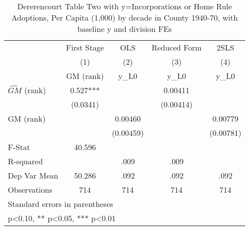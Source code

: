 \begin{table}[htbp]\centering
\def\sym#1{\ifmmode^{#1}\else\(^{#1}\)\fi}
\caption{Dererencourt Table Two with y=Incorporations or Home Rule Adoptions, Per Capita (1,000) by decade in County 1940-70, with baseline y and division FEs}
\begin{tabular}{l*{4}{c}}
\toprule
                    & First Stage   &         OLS   &Reduced Form   &        2SLS   \\
                    &\multicolumn{1}{c}{(1)}&\multicolumn{1}{c}{(2)}&\multicolumn{1}{c}{(3)}&\multicolumn{1}{c}{(4)}\\
                    &\multicolumn{1}{c}{GM  (rank)}&\multicolumn{1}{c}{y\_L0}&\multicolumn{1}{c}{y\_L0}&\multicolumn{1}{c}{y\_L0}\\
\midrule
$\hat{GM}$ (rank)   &       0.527***&               &     0.00411   &               \\
                    &    (0.0341)   &               &   (0.00414)   &               \\
\addlinespace
GM  (rank)          &               &     0.00460   &               &     0.00779   \\
                    &               &   (0.00459)   &               &   (0.00781)   \\
\midrule
F-Stat              &      40.596   &               &               &               \\
R-squared           &               &        .009   &        .009   &               \\
Dep Var Mean        &      50.286   &        .092   &        .092   &        .092   \\
Observations        &         714   &         714   &         714   &         714   \\
\bottomrule
\multicolumn{5}{l}{\footnotesize Standard errors in parentheses}\\
\multicolumn{5}{l}{\footnotesize * p<0.10, ** p<0.05, *** p<0.01}\\
\end{tabular}
\end{table}

